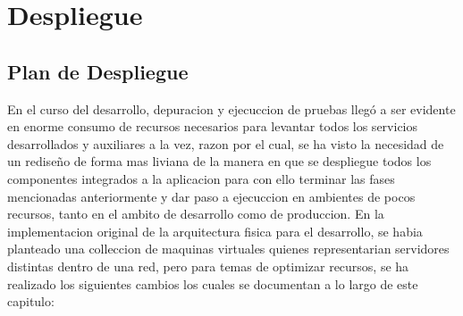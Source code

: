 
\chapter{Despliegue}
\label{capitulo6}

\section{Plan de Despliegue}
En el curso del desarrollo, depuracion y ejecuccion de pruebas llegó a ser evidente en enorme consumo de recursos necesarios para levantar todos los servicios desarrollados y auxiliares a la vez, razon por el cual, se ha visto la necesidad de un rediseño de forma mas liviana de la manera en que se despliegue todos los componentes integrados a la aplicacion para con ello terminar las fases mencionadas anteriormente y dar paso a ejecuccion en ambientes de pocos recursos, tanto en el ambito de desarrollo como de produccion. En la implementacion original de la arquitectura fisica para el desarrollo, se habia planteado una colleccion de maquinas virtuales quienes representarian servidores distintas dentro de una red, pero para temas de optimizar recursos, se ha realizado los siguientes cambios los cuales se documentan a lo largo de este capitulo:
